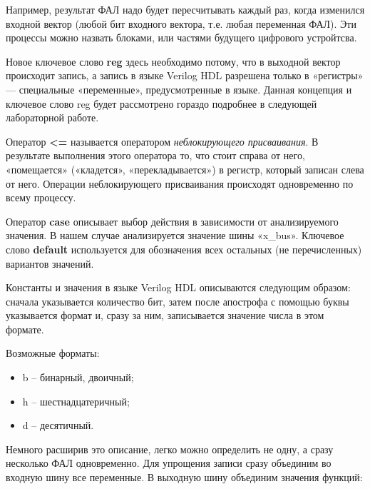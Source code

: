 \documentclass[a5paper, DIV=14, headings=openany, twoside=true,fontsize=10pt, titlepage]{scrreprt}
\newcommand{\quotes}[1]{«#1»}
\newcommand{\eng}[1]{\foreignlanguage{english}{#1}}
\newcommand{\qeng}[1]{\quotes{\eng{#1}}}
\newcommand{\kword}[1]{\eng{\textbf{#1}}}
\begin{document}
\par{Например, результат ФАЛ надо будет пересчитывать каждый раз, когда изменился входной вектор (любой бит входного вектора, т.е. любая переменная ФАЛ). Эти процессы можно назвать блоками, или частями будущего цифрового устройтсва.}

\par{Новое ключевое слово \kword{reg} здесь необходимо потому, что в выходной вектор происходит запись, а запись в языке \eng{Verilog HDL} разрешена только в «регистры» — специальные «переменные», предусмотренные в языке. Данная концепция и ключевое слово reg будет рассмотрено гораздо подробнее в следующей лабораторной работе.}

\par{Оператор \kword{<=} называется оператором \emph{неблокирующего присваивания}. В результате выполнения этого оператора то, что стоит справа от него, «помещается» («кладется», «перекладывается») в регистр, который записан слева от него. Операции неблокирующего присваивания происходят одновременно по всему процессу.}

\par{Оператор \kword{case} описывает выбор действия в зависимости от анализируемого значения. В нашем случае анализируется значение шины \qeng{x\_bus}. Ключевое слово \kword{default} используется для обозначения всех остальных (не перечисленных) вариантов значений.}

\par{Константы и значения в языке \eng{Verilog HDL} описываются следующим образом: сначала указывается количество бит, затем после апострофа с помощью буквы указывается формат и, сразу за ним, записывается значение числа в этом формате.}

\par{Возможные форматы:
  \begin{itemize}[noitemsep,topsep=0pt, after=\vspace{2pt}]
    \item b – бинарный, двоичный;
    \item h – шестнадцатеричный;
    \item d – десятичный.
  \end{itemize}}

\par{Немного расширив это описание, легко можно определить не одну, а сразу несколько ФАЛ одновременно. Для упрощения записи сразу объединим во входную шину все переменные. В выходную шину объединим значения функций:}
\end{document}
